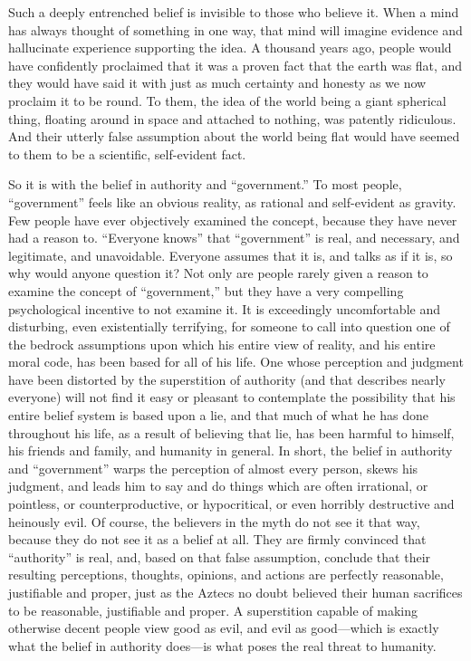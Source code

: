 \documentclass{book}
\begin{document}
Such a deeply entrenched belief is invisible to those who believe it. When a mind has always thought of something in one way, that mind will imagine evidence and hallucinate experience supporting the idea. A thousand years ago, people would have confidently proclaimed that it was a proven fact that the earth was flat, and they would have said it with just as much certainty and honesty as we now proclaim it to be round. To them, the idea of the world being a giant spherical thing, floating around in space and attached to nothing, was patently ridiculous. And their utterly false assumption about the world being flat would have seemed to them to be a scientific, self-evident fact.

So it is with the belief in authority and \enquote{government.} To most people, \enquote{government} feels like an obvious reality, as rational and self-evident as gravity. Few people have ever objectively examined the concept, because they have never had a reason to. \enquote{Everyone knows} that \enquote{government} is real, and necessary, and legitimate, and unavoidable. Everyone assumes that it is, and talks as if it is, so why would anyone question it? Not only are people rarely given a reason to examine the concept of \enquote{government,} but they have a very compelling psychological incentive to not examine it. It is exceedingly uncomfortable and disturbing, even existentially terrifying, for someone to call into question one of the bedrock assumptions upon which his entire view of reality, and his entire moral code, has been based for all of his life. One whose perception and judgment have been distorted by the superstition of authority (and that describes nearly everyone) will not find it easy or pleasant to contemplate the possibility that his entire belief system is based upon a lie, and that much of what he has done throughout his life, as a result of believing that lie, has been harmful to himself, his friends and family, and humanity in general. In short, the belief in authority and \enquote{government} warps the perception of almost every person, skews his judgment, and leads him to say and do things which are often irrational, or pointless, or counterproductive, or hypocritical, or even horribly destructive and heinously evil. Of course, the believers in the myth do not see it that way, because they do not see it as a belief at all. They are firmly convinced that \enquote{authority} is real, and, based on that false assumption, conclude that their resulting perceptions, thoughts, opinions, and actions are perfectly reasonable, justifiable and proper, just as the Aztecs no doubt believed their human sacrifices to be reasonable, justifiable and proper. A superstition capable of making otherwise decent people view good as evil, and evil as good---which is exactly what the belief in authority does---is what poses the real threat to humanity.
\end{document}
